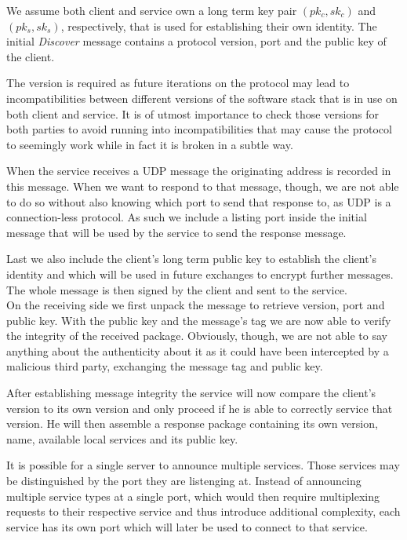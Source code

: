 We assume both client and service own a long term key pair $(pk_c, sk_c)$ and $(pk_s, sk_s)$, respectively, that is used for establishing their own identity.
The initial \emph{Discover} message contains a protocol version, port and the public key of the client.

The version is required as future iterations on the protocol may lead to incompatibilities between different versions of the software stack that is in use on both client and service.
It is of utmost importance to check those versions for both parties to avoid running into incompatibilities that may cause the protocol to seemingly work while in fact it is broken in a subtle way.

When the service receives a UDP message the originating address is recorded in this message.
When we want to respond to that message, though, we are not able to do so without also knowing which port to send that response to, as UDP is a connection-less protocol.
As such we include a listing port inside the initial message that will be used by the service to send the response message.

Last we also include the client's long term public key to establish the client's identity and which will be used in future exchanges to encrypt further messages.
The whole message is then signed by the client and sent to the service.\\

On the receiving side we first unpack the message to retrieve version, port and public key.
With the public key and the message's tag we are now able to verify the integrity of the received package.
Obviously, though, we are not able to say anything about the authenticity about it as it could have been intercepted by a malicious third party, exchanging the message tag and public key.

After establishing message integrity the service will now compare the client's version to its own version and only proceed if he is able to correctly service that version.
He will then assemble a response package containing its own version, name, available local services and its public key.

It is possible for a single server to announce multiple services.
Those services may be distinguished by the port they are listenging at.
Instead of announcing multiple service types at a single port, which would then require multiplexing requests to their respective service and thus introduce additional complexity, each service has its own port which will later be used to connect to that service.

